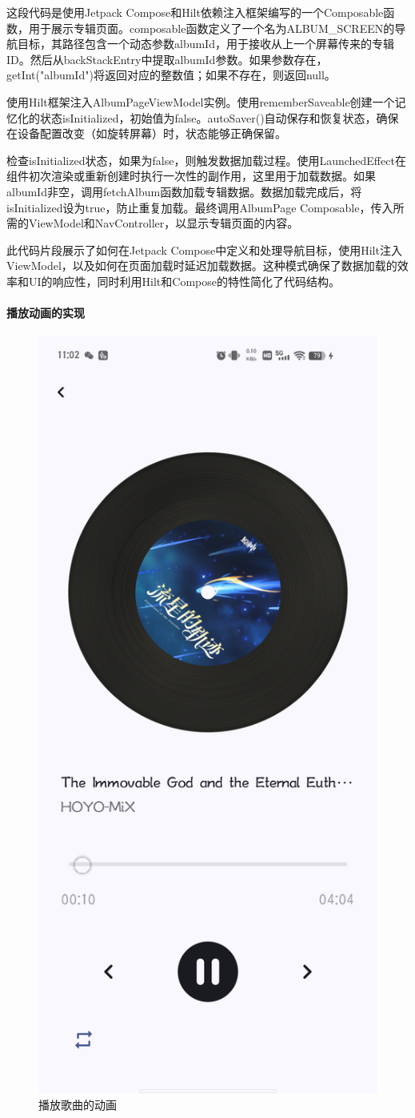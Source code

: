 \documentclass[main.tex]{subfiles}
\begin{document}
这段代码是使用Jetpack Compose和Hilt依赖注入框架编写的一个Composable函数，用于展示专辑页面。composable函数定义了一个名为ALBUM\_SCREEN的导航目标，其路径包含一个动态参数{albumId}，用于接收从上一个屏幕传来的专辑ID。然后从backStackEntry中提取albumId参数。如果参数存在，getInt("albumId")将返回对应的整数值；如果不存在，则返回null。

使用Hilt框架注入AlbumPageViewModel实例。使用rememberSaveable创建一个记忆化的状态isInitialized，初始值为false。autoSaver()自动保存和恢复状态，确保在设备配置改变（如旋转屏幕）时，状态能够正确保留。

检查isInitialized状态，如果为false，则触发数据加载过程。使用LaunchedEffect在组件初次渲染或重新创建时执行一次性的副作用，这里用于加载数据。如果albumId非空，调用fetchAlbum函数加载专辑数据。数据加载完成后，将isInitialized设为true，防止重复加载。最终调用AlbumPage Composable，传入所需的ViewModel和NavController，以显示专辑页面的内容。

此代码片段展示了如何在Jetpack Compose中定义和处理导航目标，使用Hilt注入ViewModel，以及如何在页面加载时延迟加载数据。这种模式确保了数据加载的效率和UI的响应性，同时利用Hilt和Compose的特性简化了代码结构。

\paragraph{播放动画的实现}

\begin{figure}[htbp]
    \centering
    \includegraphics[width=0.4\linewidth]{assets/song-playing.png}
    \caption{播放歌曲的动画}
    \label{fig:song-playing}
\end{figure}
\end{document}
